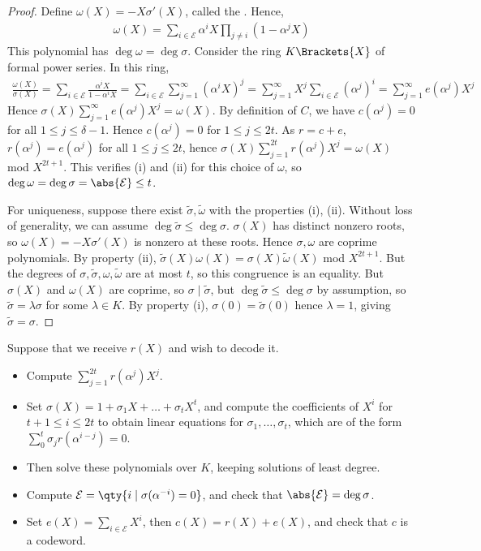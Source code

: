 \begin{proof}
    Define $\omega(X) = -X\sigma'(X)$, called the .
    Hence,
    \begin{align*}
        \omega(X) = \sum_{i \in \mathcal E} \alpha^i X \prod_{j \neq i} (1 - \alpha^j X)
    \end{align*}
    This polynomial has $\deg \omega = \deg \sigma$.
    Consider the ring $K\Brackets{X}$ of formal power series.
    In this ring,
    \begin{align*}
        \frac{\omega(X)}{\sigma(X)} = \sum_{i \in \mathcal E} \frac{\alpha^i X}{1 - \alpha^i X} = \sum_{i \in \mathcal E} \sum_{j = 1}^\infty (\alpha^i X)^j = \sum_{j=1}^\infty X^j \sum_{i \in \mathcal E} (\alpha^j)^i = \sum_{j=1}^\infty e(\alpha^j) X^j
    \end{align*}
    Hence $\sigma(X) \sum_{j=1}^\infty e(\alpha^j) X^j = \omega(X)$.
    By definition of $C$, we have $c(\alpha^j) = 0$ for all $1 \leq j \leq \delta - 1$.
    Hence $c(\alpha^j) = 0$ for $1 \leq j \leq 2t$.
    As $r = c + e$, $r(\alpha^j) = e(\alpha^j)$ for all $1 \leq j \leq 2t$, hence $\sigma(X) \sum_{j=1}^{2t} r(\alpha^j) X^j = \omega(X)$ mod $X^{2t+1}$.
    This verifies (i) and (ii) for this choice of $\omega$, so $\deg \omega = \deg \sigma = \abs{\mathcal E} \leq t$.

    For uniqueness, suppose there exist $\widetilde \sigma, \widetilde \omega$ with the properties (i), (ii).
    Without loss of generality, we can assume $\deg \widetilde \sigma \leq \deg \sigma$.
    $\sigma(X)$ has distinct nonzero roots, so $\omega(X) = -X\sigma'(X)$ is nonzero at these roots.
    Hence $\sigma, \omega$ are coprime polynomials.
    By property (ii), $\widetilde \sigma(X) \omega(X) = \sigma(X) \widetilde \omega(X)$ mod $X^{2t+1}$.
    But the degrees of $\sigma, \widetilde \sigma, \omega, \widetilde \omega$ are at most $t$, so this congruence is an equality.
    But $\sigma(X)$ and $\omega(X)$ are coprime, so $\sigma \mid \widetilde \sigma$, but $\deg \widetilde \sigma \leq \deg \sigma$ by assumption, so $\widetilde \sigma = \lambda \sigma$ for some $\lambda \in K$.
    By property (i), $\sigma(0) = \widetilde\sigma(0)$ hence $\lambda = 1$, giving $\widetilde \sigma = \sigma$.
\end{proof}
Suppose that we receive $r(X)$ and wish to decode it.
\begin{itemize}
    \item Compute $\sum_{j=1}^{2t} r(\alpha^j) X^j$.
    \item Set $\sigma(X) = 1 + \sigma_1 X + \dots + \sigma_t X^t$, and compute the coefficients of $X^i$ for $t + 1 \leq i \leq 2t$ to obtain linear equations for $\sigma_1, \dots, \sigma_t$, which are of the form $\sum_0^t \sigma_j r(\alpha^{i-j}) = 0$.
    \item Then solve these polynomials over $K$, keeping solutions of least degree.
    \item Compute $\mathcal E = \qty{i \mid \sigma(\alpha^{-i}) = 0}$, and check that $\abs{\mathcal E} = \deg \sigma$.
    \item Set $e(X) = \sum_{i \in \mathcal E} X^i$, then $c(X) = r(X) + e(X)$, and check that $c$ is a codeword.
\end{itemize}
